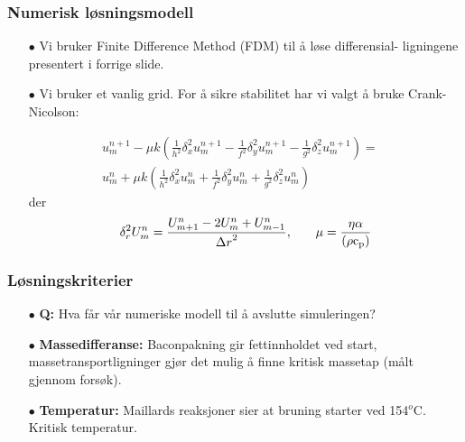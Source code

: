 \documentclass[screen]{beamer}
\begin{document}
\begin{frame}
  \frametitle{Numerisk løsningsmodell}
  \begin{itemize}
    \item[$\bullet$] Vi bruker Finite Difference Method (FDM) til å løse differensial-
ligningene presentert i forrige slide.

\item[$\bullet$] Vi bruker et vanlig grid. For å sikre stabilitet har vi valgt
å bruke Crank-Nicolson:

\begin{eqnarray*}
u_m^{n+1}-\mu k(\frac{1}{h^2}\delta_x^2 u_m^{n+1}-\frac{1}{f^2}\delta_y^2 u_m^{n+1}-\frac{1}{g^2}\delta_z^2 u_m^{n+1})= &  \\
u_m^n + \mu k(\frac{1}{h^2}\delta_x^2 u_m^n + \frac{1}{f^2}\delta_y^2 u_m^n +\frac{1}{g^2}\delta_z^2 u_m^n)&
\end{eqnarray*}
der
\begin{equation*}
\delta_{r}^{2}U_m^{n}=\frac{U_{m+1}^{n}-2U_m^{n}+U_{m-1}^{n}}{{\Delta r}^{2}} \rm{,} \quad \quad \mu =\frac{\eta\alpha}{(\rho c_p)}
\end{equation*}


  \end{itemize}
\end{frame}

\begin{frame}
  \frametitle{Løsningskriterier}
  \begin{center}
  \begin{itemize}  
    \item[$\bullet$] \textbf{Q:} Hva får vår numeriske modell
      til å avslutte simuleringen?

    \item[$\bullet$] \textbf{Massedifferanse:} Baconpakning gir fettinnholdet ved start,
  massetransportligninger gjør det mulig å finne kritisk massetap (målt gjennom forsøk).

\item[$\bullet$] \textbf{Temperatur:} Maillards reaksjoner sier at bruning starter ved
  154$^o$C. Kritisk temperatur.
  \end{itemize}
  \end{center}
\end{frame}
\end{document}
